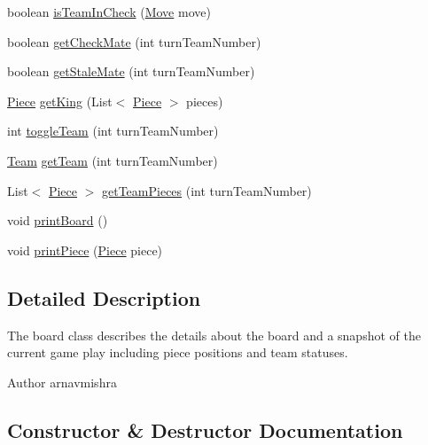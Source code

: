 \begin{DoxyCompactItemize}
\item 
boolean \hyperlink{class_model_1_1_board_a9d041c45865ca1db8ff39c9f4fce204e}{is\+Team\+In\+Check} (\hyperlink{class_model_1_1_move}{Move} move)
\item 
boolean \hyperlink{class_model_1_1_board_a16886f1ae73fae80ffbd439cda934e8a}{get\+Check\+Mate} (int turn\+Team\+Number)
\item 
boolean \hyperlink{class_model_1_1_board_a6a8d2dc192be22d581618ac2b3301966}{get\+Stale\+Mate} (int turn\+Team\+Number)
\item 
\hyperlink{class_model_1_1_pieces_1_1_piece}{Piece} \hyperlink{class_model_1_1_board_a0513468651fe1afccc197f700e2c760d}{get\+King} (List$<$ \hyperlink{class_model_1_1_pieces_1_1_piece}{Piece} $>$ pieces)
\item 
int \hyperlink{class_model_1_1_board_a6fac52f7cf767e242f6d202a9e52eb8c}{toggle\+Team} (int turn\+Team\+Number)
\item 
\hyperlink{class_model_1_1_team}{Team} \hyperlink{class_model_1_1_board_afbbd0336890f96410b94a622290db60d}{get\+Team} (int turn\+Team\+Number)
\item 
List$<$ \hyperlink{class_model_1_1_pieces_1_1_piece}{Piece} $>$ \hyperlink{class_model_1_1_board_abce1029b057dce2939f5dd78abad3cec}{get\+Team\+Pieces} (int turn\+Team\+Number)
\item 
void \hyperlink{class_model_1_1_board_a07633635c4378b1824a69deddfb521d5}{print\+Board} ()
\item 
void \hyperlink{class_model_1_1_board_a79dabcf1688b67bac808be8c67364bce}{print\+Piece} (\hyperlink{class_model_1_1_pieces_1_1_piece}{Piece} piece)
\end{DoxyCompactItemize}


\subsection{Detailed Description}
The board class describes the details about the board and a snapshot of the current game play including piece positions and team statuses. \begin{DoxyAuthor}{Author}
arnavmishra 
\end{DoxyAuthor}


\subsection{Constructor \& Destructor Documentation}
\hypertarget{class_model_1_1_board_a9deb765ab1477d72b1674de48a9a6584}{}\label{class_model_1_1_board_a9deb765ab1477d72b1674de48a9a6584} 
